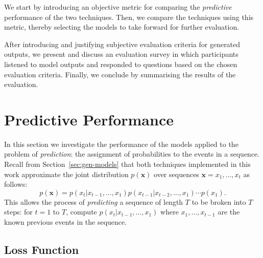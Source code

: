 \documentclass[12pt,a4paper,twoside,openright]{report}
\newcommand{\sref}[1]{Section~\ref{#1}}
\newcommand{\vect}[1]{\boldsymbol{\mathbf{#1}}}
\begin{document}
\vspace{4mm}

We start by introducing an objective metric for comparing the \emph{predictive}
performance of the two techniques. Then, we compare the techniques using this
metric, thereby selecting the models to take forward for further evaluation. 

After introducing and justifying subjective evaluation criteria for generated
outputs, we present and discuss an evaluation survey in which participants
listened to model outputs and responded to questions based on the chosen
evaluation criteria. Finally, we conclude by summarising the results of the
evaluation.

\section{Predictive Performance}

In this section we investigate the performance of the models applied to the
problem of \emph{prediction}: the assignment of probabilities to the events in a
sequence. Recall from \sref{sec:gen-models} that both techniques
implemented in this work approximate the joint distribution $p(\vect{x})$ over
sequences $\vect{x} = x_1,\ldots,x_t$ as follows:
$$ p(\vect{x}) = p(x_t | x_{t-1}, \ldots, x_1) p(x_{t-1} | x_{t-2}, \ldots, x_1)
\cdots p(x_1). $$
This allows the process of \emph{predicting} a sequence of length $T$ to be
broken into $T$ steps: for $t = 1$ to $T$, compute $p(x_t | x_{t-1}, \ldots,
x_1)$ where $x_1, \ldots, x_{t-1}$ are the known previous events in the
sequence. 


\subsection{Loss Function}
\end{document}
